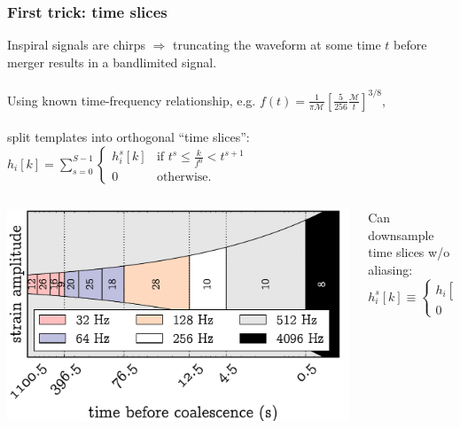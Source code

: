 \documentclass{beamer}
\begin{document}
\section[Implementation]{}

\begin{frame}
	\frametitle{First trick: time slices}

	Inspiral signals are chirps $\Rightarrow$ truncating the waveform at some time $t$ before merger results in a bandlimited signal. \\~\\

	\footnotesize{
	Using known time-frequency relationship, e.g. $f(t) = \frac{1}{\pi \mathcal{M}} \left[ \frac{5}{256}\frac{\mathcal{M}}{t}\right]^{3/8}$, \\~\\

	split templates into orthogonal ``time slices'':
	$
	\label{eq:time-slices}
	h_{i}[k] = \sum\limits_{s=0}^{S-1}
		\begin{cases}
			h_i^s[k] & \textrm{if } t^s \leqslant \frac{k}{f^0} < t^{s+1} \\
			0 & \textrm{otherwise.}
		\end{cases}
	$}

	\begin{columns}
		\begin{column}{0.5\textwidth}
			\includegraphics[width=\textwidth]{figures/envelope}
		\end{column}
		\begin{column}{0.5\textwidth}
			\footnotesize{Can downsample time slices w/o aliasing:
			$$
			h_{i}^{s}[k] \equiv
				\begin{cases}
					h_{i}\!\left[k\frac{f}{f^s}\right] & \textrm{if } t^s \leqslant k/f^s < t^{s+1} \\
					0 & \textrm{otherwise.}
				\end{cases}
			$$
			}
		\end{column}
	\end{columns}
\end{frame}
\end{document}
